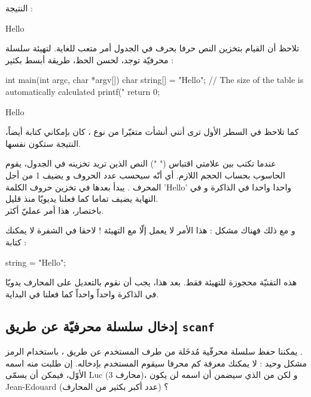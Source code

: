 النتيجة :

\begin{Console}
Hello
\end{Console}

تلاحظ أن القيام بتخزين النص حرفا بحرف في الجدول
أمر متعب للغاية. لتهيئة سلسلة محرفيّة توجد، لحسن الحظ، طريقة أبسط بكثير :

\begin{Csource}
int main(int argc, char *argv[])
{
	char string[] = "Hello"; // The size of the table is automatically calculated
	printf("%
	return 0;
}
\end{Csource}

\begin{Console}
Hello
\end{Console}

كما تلاحظ في السطر الأول ترى أنني أنشأت متغيّرا من نوع
،
كان بإمكاني كتابة
أيضاً، النتيجة ستكون نفسها.

عندما تكتب بين علامتي اقتباس (" ") النص الذين تريد تخزينه في الجدول، يقوم الحاسوب بحساب الحجم اللازم. أي أنّه سيحسب عدد الحروف و يضيف 1 من أجل المحرف
.
يبدأ بعدها في تخزين حروف الكلمة
'\textenglish{Hello}'
واحدا واحدا في الذاكرة و في النهاية يضيف
تماما كما فعلنا يديويّا منذ قليل.\\
باختصار، هذا أمر عمليّ أكثر.

و مع ذلك فهناك مشكل : هذا الأمر لا يعمل إلّا مع التهيئة ! لاحقا في الشفرة لا يمكنك كتابة :

\begin{Csource}
string = "Hello";
\end{Csource}

هذه التقنيّة محجوزة للتهيئة فقط. بعد هذا، يجب أن نقوم بالتعديل على المحارف يدويّا في الذاكرة واحداً واحداً كما فعلنا في البداية.

\subsection{إدخال سلسلة محرفيّة عن طريق \texttt{scanf}}

يمكننا حفظ سلسلة محرفّية مُدخَلة من طرف المستخدم عن طريق
،
باستخدام الرمز
.\\
مشكل وحيد : لا يمكنك معرفة كم محرفا سيقوم المستخدم بإدخاله. إن طلبت منه اسمه الأوّل، فيمكن أن يسمّى
\textenglish{Luc}
(3 محارف)، و لكن من الذي سيضمن أن اسمه لن يكون
\textenglish{Jean-Edouard}
(عدد أكبر بكثير من المحارف) ؟


